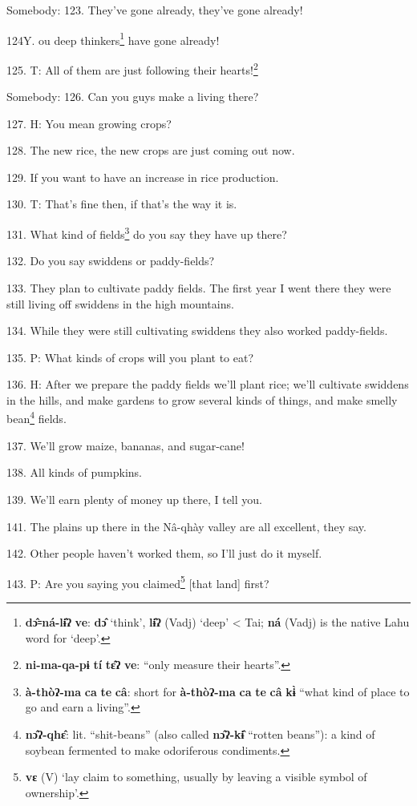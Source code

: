 Somebody: 123. They've gone already, they've gone already!

124Y. ou deep thinkers\footnote{\textbf{dɔ̂꞊ná-lɨ̂ʔ} \textbf{ve}: \textbf{dɔ̂} `think', \textbf{lɨ̂ʔ} (Vadj) `deep' < Tai; \textbf{ná} (Vadj) is the native Lahu word for `deep'.} have gone already!

125. T: All of them are just following their hearts!\footnote{\textbf{ni-ma-qa-pɨ} \textbf{tí} \textbf{tɛ̂ʔ} \textbf{ve}: ``only measure their hearts''.}

Somebody: 126. Can you guys make a living there?

127. H: You mean growing crops?

128. The new rice, the new crops are just coming out now.

129. If you want to have an increase in rice production.

130. T: That's fine then, if that's the way it is.

131. What kind of fields\footnote{\textbf{à-thòʔ-ma} \textbf{ca} \textbf{te} \textbf{câ}: short for \textbf{à-thòʔ-ma} \textbf{ca} \textbf{te} \textbf{câ} \textbf{kɨ̀} ``what kind of place to go and earn a living''.} do you say they have up there?

132. Do you say swiddens or paddy-fields?

133. They plan to cultivate paddy fields. The first year I went there they were
still living off swiddens in the high mountains.

134. While they were still cultivating swiddens they also worked paddy-fields.

135. P: What kinds of crops will you plant to eat?

136. H: After we prepare the paddy fields we'll plant rice; we'll cultivate swiddens
in the hills, and make gardens to grow several kinds of things, and make smelly
bean\footnote{\textbf{nɔ̂ʔ-qhɛ̂}: lit. ``shit-beans'' (also called \textbf{nɔ̂ʔ-kɨ̂} ``rotten beans''): a kind of soybean fermented to make odoriferous condiments.} fields.

137. We'll grow maize, bananas, and sugar-cane!

138. All kinds of pumpkins.

139. We'll earn plenty of money up there, I tell you.

141. The plains up there in the Nâ-qhày valley are all excellent, they say.

142. Other people haven't worked them, so I'll just do it myself.

143. P: Are you saying you claimed\footnote{\textbf{vɛ} (V) `lay claim to something, usually by leaving a visible symbol of ownership'.} [that land] first?

